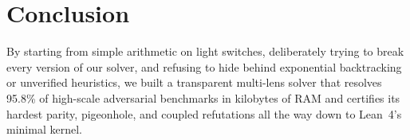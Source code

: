 \documentclass[11pt]{article}
\begin{document}
\section{Conclusion}

By starting from simple arithmetic on light switches, deliberately trying to break every version of our solver, and refusing to hide behind exponential backtracking or unverified heuristics, we built a transparent multi-lens solver that resolves 95.8\% of high-scale adversarial benchmarks in kilobytes of RAM and certifies its hardest parity, pigeonhole, and coupled refutations all the way down to Lean~4's minimal kernel.
\end{document}
